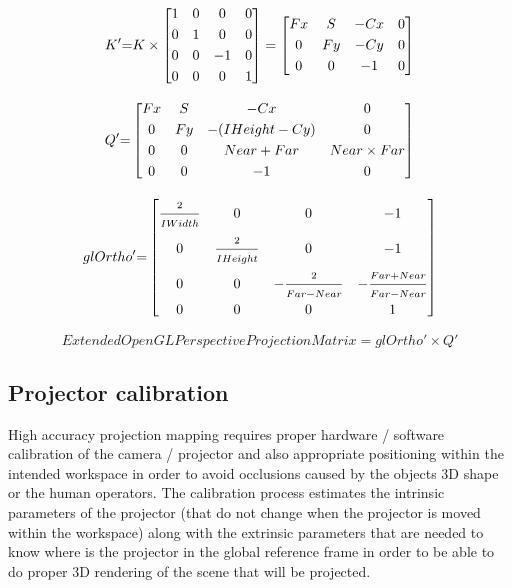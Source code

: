 {	\begin{equation}\label{eq:k2}
		K'{=}
		K
		\times
		\begin{bmatrix}
		1 & 0 & 0 & 0 \\[\smallskipamount]
		0 & 1 & 0 & 0 \\[\smallskipamount]
		0 & 0 & -1 & 0 \\[\smallskipamount]
		0 & 0 & 0 & 1
		\end{bmatrix}
		=
		\begin{bmatrix}
		Fx & S & -Cx & 0 \\[\smallskipamount]
		0 & Fy & -Cy & 0 \\[\smallskipamount]
		0 & 0 & -1 & 0
		\end{bmatrix}
	\end{equation}

	\begin{equation}\label{eq:q2}
		Q'{=}
		\begin{bmatrix}
			Fx & S & -Cx & 0 \\[\smallskipamount]
			0 & Fy & -(IHeight - Cy) & 0 \\[\smallskipamount]
			0 & 0 & Near + Far & Near \times Far \\[\smallskipamount]
			0 & 0 & -1 & 0
		\end{bmatrix}
	\end{equation}

	\begin{equation}\label{eq:glOrtho2}
		glOrtho'{=}
		\begin{bmatrix}
			\vfrac{2}{IWidth} & 0 & 0 & -1 \\[\smallskipamount]
			0 & \vfrac{2}{IHeight} & 0 & -1 \\[\smallskipamount]
			0 & 0 & -\vfrac{2}{Far - Near} & -\vfrac{Far + Near}{Far - Near} \\[\smallskipamount]
			0 & 0 & 0 & 1
		\end{bmatrix}
	\end{equation}

	\begin{equation}\label{eq:projection-matrix}
		ExtendedOpenGLPerspectiveProjectionMatrix = glOrtho' \times Q'
	\end{equation}
}%


\subsection{Projector calibration}

High accuracy projection mapping requires proper hardware / software calibration of the camera / projector and also appropriate positioning within the intended workspace in order to avoid occlusions caused by the objects 3D shape or the human operators. The calibration process estimates the intrinsic parameters of the projector (that do not change when the projector is moved within the workspace) along with the extrinsic parameters that are needed to know where is the projector in the global reference frame in order to be able to do proper 3D rendering of the scene that will be projected.


